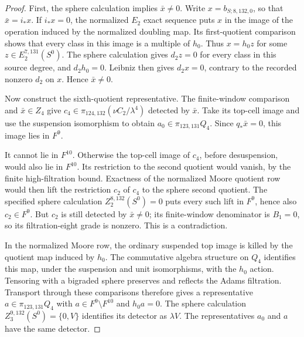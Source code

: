 \begin{proof}
First, the sphere calculation implies $\bar x\ne0$. Write
$x=b_{S;8,132,0}$, so that $\bar x=i_*x$. If $i_*x=0$, the
normalized $E_2$ exact sequence puts $x$ in the image of the operation
induced by the normalized doubling map. Its first-quotient comparison
shows that every class in this image is a multiple of $h_0$.
Thus $x=h_0z$ for some $z\in E_2^{7,131}(S^0)$. The sphere
calculation gives $d_2z=0$ for every class in this source degree, and
$d_2h_0=0$. Leibniz then gives $d_2x=0$, contrary to the recorded
nonzero $d_2$ on $x$. Hence $\bar x\ne0$.

Now construct the sixth-quotient representative. The finite-window
comparison and $\bar x\in Z_4$ give
$c_4\in\pi_{124,132}(\nu C_2/\lambda^4)$ detected by $\bar x$.
Take its top-cell image and use the suspension isomorphism
to obtain $a_0\in\pi_{123,131}Q_4$. Since $q_*\bar x=0$, this image
lies in $F^9$.

It cannot lie in $F^{10}$. Otherwise the top-cell image of $c_4$,
before desuspension, would also lie in $F^{10}$. Its restriction to the
second quotient would vanish, by the finite high-filtration bound. Exactness of
the normalized Moore quotient row would then lift the restriction
$c_2$ of $c_4$ to the sphere second quotient. The specified sphere
calculation $Z_2^{8,132}(S^0)=0$ puts every such lift in $F^9$, hence
also $c_2\in F^9$. But $c_2$ is still detected by $\bar x\ne0$; its
finite-window denominator is $B_1=0$, so its filtration-eight grade is
nonzero. This is a contradiction.

In the normalized Moore row, the ordinary suspended top image is killed
by the quotient map induced by $h_0$. The commutative algebra structure
on $Q_4$ identifies this map, under the suspension and unit isomorphisms, with the
$h_0$ action. Tensoring with a bigraded sphere preserves and reflects the
Adams filtration. Transport through these comparisons therefore
gives a representative $a\in\pi_{123,131}Q_4$ with
$a\in F^9\setminus F^{10}$ and $h_0a=0$. The sphere calculation
$Z_3^{9,132}(S^0)=\{0,V\}$ identifies its detector as $\lambda V$.
The representatives $a_0$ and $a$ have the same detector.


\end{proof}
